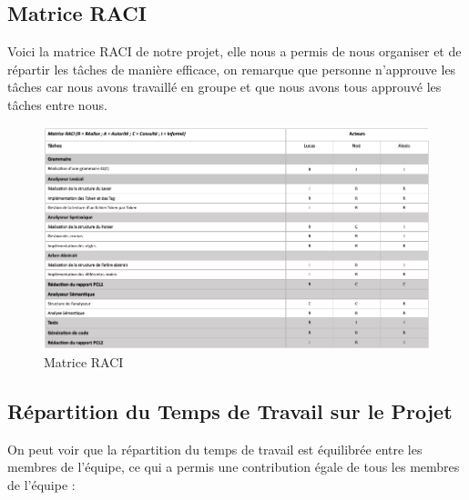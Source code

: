 \documentclass[french,a4paper]{article}
\begin{document}
    \subsection{Matrice RACI}\label{subsec:matrice-raci}
    Voici la matrice RACI de notre projet, elle nous a permis de nous organiser et de répartir les tâches de manière efficace, on remarque que personne n'approuve les tâches car nous avons travaillé en groupe et que nous avons tous approuvé les tâches entre nous.

    \begin{figure}[H]
        \centering
        \includegraphics[width=1\textwidth]{RACI}
        \caption{Matrice RACI}\label{fig:figure3}
    \end{figure}

    \subsection{Répartition du Temps de Travail sur le Projet}\label{subsec:repartition-du-temps-de-travail-sur-le-projet}

    On peut voir que la répartition du temps de travail est équilibrée entre les membres de l'équipe, ce qui a permis une contribution égale de tous les membres de l'équipe :
    \newline
\end{document}
